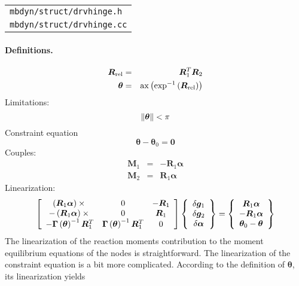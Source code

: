 \documentclass[10pt,dvips,fleqn,subeqn]{report}
\newcommand{\T}[1]{\bm{#1}}
\begin{document}
\begin{tabular}{l}
\texttt{mbdyn/struct/drvhinge.h} \\
\texttt{mbdyn/struct/drvhinge.cc}
\end{tabular}

\paragraph{Definitions.}
\begin{eqnarray*}
	\T{R}_{\text{rel}} & = & \T{R}_1^T \T{R}_2 \\
	\T{\theta} & = & \llk{ax}\plbr{\llk{exp}^{-1}\plbr{\T{R}_{\text{rel}}}}
\end{eqnarray*}
Limitations:
\begin{equation}
	\nrbr{\T{\theta}} < \pi
\end{equation}
Constraint equation 
\begin{equation}
	\T{\theta} - \T{\theta}_0 = \T{0}
\end{equation}
Couples:
\begin{eqnarray*}
	\T{M}_1 & = & -\T{R}_1 \T{\alpha} \\
	\T{M}_2 & = & \T{R}_1 \T{\alpha}
\end{eqnarray*}
Linearization:
\begin{equation}
	\sqbr{\matr{ccc}{
		\plbr{\T{R}_1 \T{\alpha}}\times{} & 0 & -\T{R}_1 \\
		-\plbr{\T{R}_1 \T{\alpha}}\times{} & 0 & \T{R}_1 \\
		-\T{\Gamma}\plbr{\T{\theta}}^{-1} \T{R}_1^T &
			\T{\Gamma}\plbr{\T{\theta}}^{-1} \T{R}_1^T & 0
	}}\cubr{\cvvect{
		\delta\T{g}_1 \\
		\delta\T{g}_2 \\
		\delta\T{\alpha} \\
	}} = \cubr{\cvvect{
		\T{R}_1 \T{\alpha} \\
		-\T{R}_1 \T{\alpha} \\
		\T{\theta}_0 - \T{\theta}
	}}
\end{equation}
The linearization of the reaction moments contribution 
to the moment equilibrium equations of the nodes is straightforward.
The linearization of the constraint equation is a bit more complicated.
According to the definition of $\T{\theta}$, its linearization
yields
\end{document}
